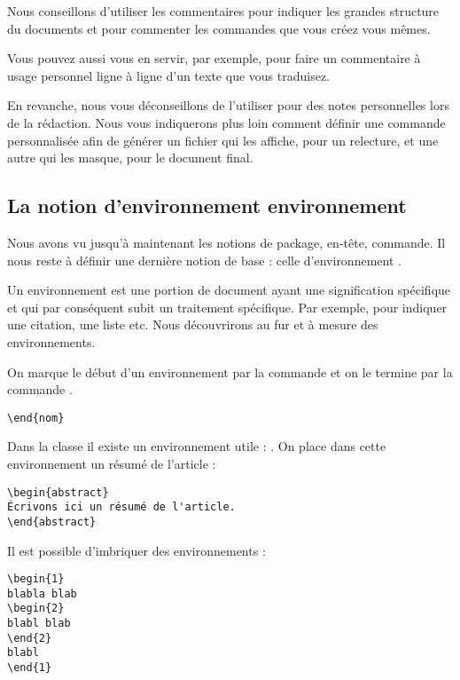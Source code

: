 Nous conseillons d'utiliser les commentaires pour indiquer les grandes structure du documents et pour commenter les commandes que vous créez vous mêmes. 

Vous pouvez aussi vous en servir, par exemple, pour faire un commentaire à usage personnel ligne à ligne d'un texte que vous traduisez.

En revanche, nous vous déconseillons de l'utiliser pour des notes personnelles lors de la rédaction. Nous vous indiquerons plus loin  comment définir une commande  personnalisée afin de générer un fichier qui les affiche, pour un relecture, et une autre qui les masque, pour le document final.



\subsection{La notion d'environnement environnement }

Nous avons vu jusqu'à maintenant les notions de  package, en-tête, commande. 
Il nous reste à définir une dernière notion de base : celle d'environnement .

Un environnement  est une portion de document ayant une signification spécifique et qui par conséquent subit un traitement spécifique. Par exemple, pour indiquer une citation, une liste etc. Nous découvrirons au fur et à mesure  des environnements. 


On marque le début d'un environnement   par la commande  et on le termine par la commande .

\begin{verbatim}
\end{nom}
\end{verbatim}


Dans la classe  il existe un environnement utile : . On place dans cette environnement un résumé de l'article :

\begin{verbatim}
\begin{abstract}
Écrivons ici un résumé de l'article. 
\end{abstract}
\end{verbatim}


Il est possible d'imbriquer des environnements :

\begin{verbatim}
\begin{1}
blabla blab
\begin{2}
blabl blab
\end{2}
blabl
\end{1}
\end{verbatim}


